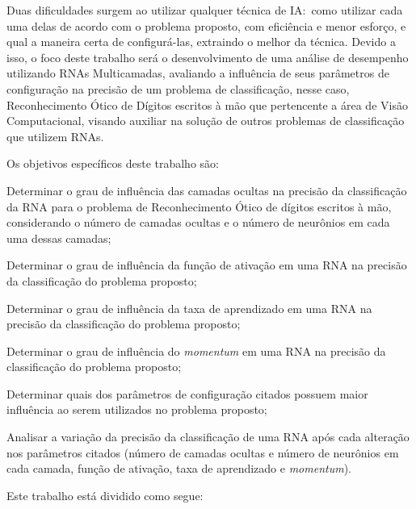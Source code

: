 \documentclass[12pt,oneside,a4paper,chapter=TITLE,section=TITLE,sumario
		=tradicional]{abntex2}
\begin{document}
		Duas dificuldades surgem ao utilizar qualquer técnica de IA:~como utilizar cada uma delas de acordo com o problema proposto, com eficiência e menor esforço, e qual a maneira certa de configurá-las, extraindo o melhor da técnica. Devido a isso, o foco deste trabalho será o desenvolvimento de uma análise de desempenho utilizando RNAs Multicamadas, avaliando a influência de seus parâmetros de configuração na precisão de um problema de classificação, nesse caso, Reconhecimento Ótico de Dígitos escritos à mão que pertencente a área de Visão Computacional, visando auxiliar na solução de outros problemas de classificação que utilizem RNAs. 
				
		Os objetivos específicos deste trabalho são:
		
		\begin{lista}
		    		  
		  \item Determinar o grau de influência das camadas ocultas na precisão da classificação da RNA para o problema de Reconhecimento Ótico de dígitos escritos à mão, considerando o número de camadas ocultas e o número de neurônios em cada uma dessas camadas;
		  
		  \item Determinar o grau de influência da função de ativação em uma RNA na precisão da classificação do problema proposto;
		  
		  \item Determinar o grau de influência da taxa de aprendizado em uma RNA na precisão da classificação do problema proposto;
		  
		  \item Determinar o grau de influência do \textit{momentum} em uma RNA na precisão da classificação do problema proposto;
		  
		  \item Determinar quais dos parâmetros de configuração citados possuem maior influência ao serem utilizados no problema proposto;
		  
		  \item Analisar a variação da precisão da classificação de uma RNA após cada alteração nos parâmetros citados (número de camadas ocultas e número de neurônios em cada camada, função de ativação, taxa de aprendizado e \textit{momentum}).
		  	  
		\end{lista}	
		
		Este trabalho está dividido como segue: 
		
\end{document}
